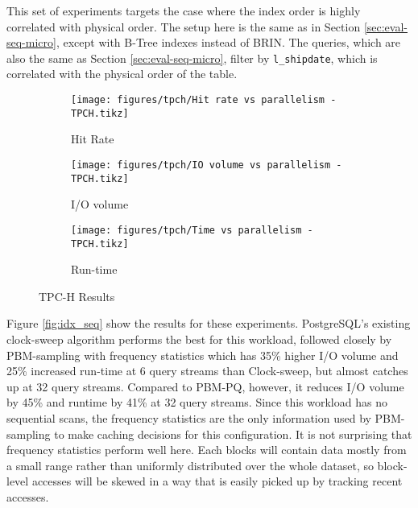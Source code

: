 This set of experiments targets the case where the index order is highly correlated with physical order. The setup here is the same as in Section \ref{sec:eval-seq-micro}, except with B-Tree indexes instead of BRIN. The queries, which are also the same as Section \ref{sec:eval-seq-micro}, filter by \verb|l_shipdate|, which is correlated with the physical order of the table. %

\begin{figure*}
    \begin{subfigure}{\textwidth}
        \centering
        \texttt{[image: figures/tpch/Hit rate vs parallelism - TPCH.tikz]}
        \caption{Hit Rate}
        \label{fig:tpch_hitrate}
    \end{subfigure}
    \begin{subfigure}{\textwidth}
        \centering
        \texttt{[image: figures/tpch/IO volume vs parallelism - TPCH.tikz]}
        \caption{I/O volume}
        \label{fig:tpch_iovol}
    \end{subfigure}
    \begin{subfigure}{\textwidth}
        \centering
        \texttt{[image: figures/tpch/Time vs parallelism - TPCH.tikz]}
        \caption{Run-time}
        \label{fig:tpch_time}
    \end{subfigure}
    \caption{TPC-H Results}
    \label{fig:tpch_results}
\end{figure*}

Figure \ref{fig:idx_seq} show the results for these experiments. PostgreSQL's existing clock-sweep algorithm performs the best for this workload, followed closely by PBM-sampling with frequency statistics which has 35\% higher I/O volume and 25\% increased run-time at 6 query streams than Clock-sweep, but almost catches up at 32 query streams. Compared to PBM-PQ, however, it reduces I/O volume by 45\% and runtime by 41\% at 32 query streams. Since this workload has no sequential scans, the frequency statistics are the only information used by PBM-sampling to make caching decisions for this configuration. It is not surprising that frequency statistics perform well here. Each blocks will contain data mostly from a small range rather than uniformly distributed over the whole dataset, so block-level accesses will be skewed in a way that is easily picked up by tracking recent accesses.

